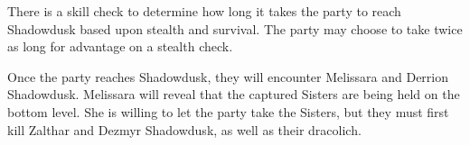 There is a skill check to determine how long it takes the party to reach Shadowdusk based upon stealth and survival.
The party may choose to take twice as long for advantage on a stealth check.

Once the party reaches Shadowdusk, they will encounter Melissara and Derrion Shadowdusk.
Melissara will reveal that the captured Sisters are being held on the bottom level.
She is willing to let the party take the Sisters, but they must first kill Zalthar and Dezmyr Shadowdusk, as well as their dracolich.